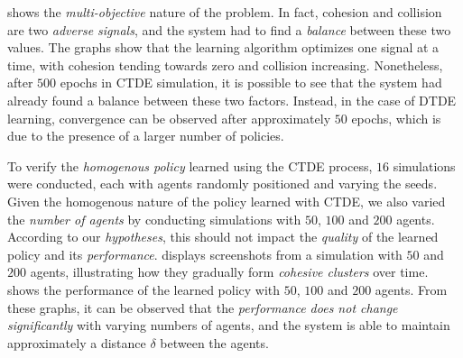 \documentclass[12pt,a4paper,openright,twoside]{book}
\begin{document}
 shows the \emph{multi-objective} nature of the problem. In fact, cohesion and collision are two \emph{adverse signals},
    and the system had to find a \emph{balance} between these two values. The graphs show that the learning algorithm optimizes one signal 
    at a time, with cohesion tending towards zero and collision increasing. Nonetheless, after $500$ epochs in CTDE simulation, 
    it is possible to see that the system had already found a balance between these two factors. 
    Instead, in the case of DTDE learning, convergence can be observed after approximately $50$ epochs, 
    which is due to the presence of a larger number of policies.

To verify the \emph{homogenous policy} learned using the CTDE process, $16$ simulations were conducted, each with agents randomly 
    positioned and varying the seeds. Given the homogenous nature of the policy learned with CTDE, we also varied the \emph{number 
    of agents} by conducting simulations with $50$, $100$ and $200$ agents. According to our \emph{hypotheses}, 
    this should not impact the \emph{quality} of the learned policy and its \emph{performance}.
     displays screenshots from a simulation with $50$ and $200$ agents, illustrating how they gradually form \emph{cohesive clusters} 
    over time.  shows the performance of the learned policy with $50$, $100$ and $200$ agents. From these graphs, it can 
    be observed that the \emph{performance does not change significantly} with varying numbers of agents, and the system is able to 
    maintain approximately a distance $\delta$ between the agents.
\end{document}
